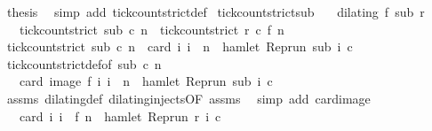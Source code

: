 \begin{isabellebody}
\ {\isacharquery}thesis\ \isamarkupfalse%
\ {\isacharparenleft}simp\ add{\isacharcolon}\ tick{\isacharunderscore}count{\isacharunderscore}strict{\isacharunderscore}def{\isacharparenright}\isanewline
{}\isamarkupfalse%
%
\endisatagproof
{\isafoldproof}%
%
\isadelimproof
\isanewline
%
\endisadelimproof
\isanewline
{}\isamarkupfalse%
\ tick{\isacharunderscore}count{\isacharunderscore}strict{\isacharunderscore}sub{\isacharcolon}\isanewline
\ \ \ {\isacartoucheopen}dilating\ f\ sub\ r{\isacartoucheclose}\isanewline
\ \ \ {\isacartoucheopen}tick{\isacharunderscore}count{\isacharunderscore}strict\ sub\ c\ n\ {\isacharequal}\ tick{\isacharunderscore}count{\isacharunderscore}strict\ r\ c\ {\isacharparenleft}f\ n{\isacharparenright}{\isacartoucheclose}\isanewline
%
\isadelimproof
%
\endisadelimproof
%
\isatagproof
{}\isamarkupfalse%
\ {\isacharminus}\isanewline
\ \ \isamarkupfalse%
\ {\isacartoucheopen}tick{\isacharunderscore}count{\isacharunderscore}strict\ sub\ c\ n\ {\isacharequal}\ card\ {\isacharbraceleft}i{\isachardot}\ i\ {\isacharless}\ n\ {\isasymand}\ hamlet\ {\isacharparenleft}{\isacharparenleft}Rep{\isacharunderscore}run\ sub{\isacharparenright}\ i\ c{\isacharparenright}{\isacharbraceright}{\isacartoucheclose}\isanewline
\ \ \ \ \isamarkupfalse%
\ tick{\isacharunderscore}count{\isacharunderscore}strict{\isacharunderscore}def{\isacharbrackleft}of\ {\isacartoucheopen}sub{\isacartoucheclose}\ {\isacartoucheopen}c{\isacartoucheclose}\ {\isacartoucheopen}n{\isacartoucheclose}{\isacharbrackright}\ \isacommand{{\isachardot}}\isamarkupfalse%
\isanewline
\ \ \isamarkupfalse%
\ \isamarkupfalse%
\ {\isacartoucheopen}{\isachardot}{\isachardot}{\isachardot}\ {\isacharequal}\ card\ {\isacharparenleft}image\ f\ {\isacharbraceleft}i{\isachardot}\ i\ {\isacharless}\ n\ {\isasymand}\ hamlet\ {\isacharparenleft}{\isacharparenleft}Rep{\isacharunderscore}run\ sub{\isacharparenright}\ i\ c{\isacharparenright}{\isacharbraceright}{\isacharparenright}{\isacartoucheclose}\isanewline
\ \ \ \ \isamarkupfalse%
\ assms\ dilating{\isacharunderscore}def\ dilating{\isacharunderscore}injects{\isacharbrackleft}OF\ assms{\isacharbrackright}\ \isamarkupfalse%
\ {\isacharparenleft}simp\ add{\isacharcolon}\ card{\isacharunderscore}image{\isacharparenright}\isanewline
\ \ \isamarkupfalse%
\ \isamarkupfalse%
\ {\isacartoucheopen}{\isachardot}{\isachardot}{\isachardot}\ {\isacharequal}\ card\ {\isacharbraceleft}i{\isachardot}\ i\ {\isacharless}\ f\ n\ {\isasymand}\ hamlet\ {\isacharparenleft}{\isacharparenleft}Rep{\isacharunderscore}run\ r{\isacharparenright}\ i\ c{\isacharparenright}{\isacharbraceright}{\isacartoucheclose}\isanewline

\end{isabellebody}
